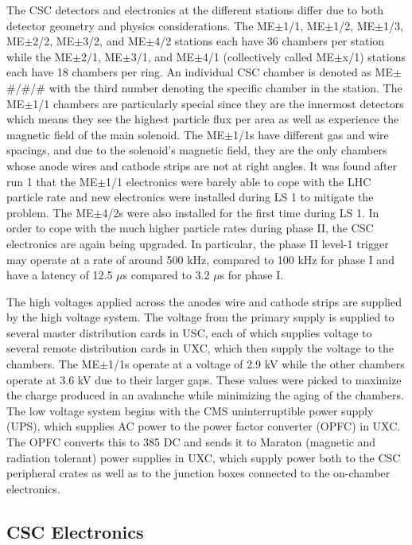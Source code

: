 \documentclass[10pt,a4paper]{article}
\begin{document}
The CSC detectors and electronics at the different stations differ due to both detector geometry and physics considerations. The ME$\pm$1/1, ME$\pm$1/2, ME$\pm$1/3, ME$\pm$2/2, ME$\pm$3/2, and ME$\pm$4/2 stations each have 36 chambers per station while the ME$\pm$2/1, ME$\pm$3/1, and ME$\pm$4/1 (collectively called ME$\pm$x/1) stations each have 18 chambers per ring. An individual CSC chamber is denoted as ME$\pm$\#/\#/\# with the third number denoting the specific chamber in the station. The ME$\pm$1/1 chambers are particularly special since they are the innermost detectors which means they see the highest particle flux per area as well as experience the magnetic field of the main solenoid. The ME$\pm$1/1s have different gas and wire spacings, and due to the solenoid's magnetic field, they are the only chambers whose anode wires and cathode strips are not at right angles. It was found after run 1 that the ME$\pm$1/1 electronics were barely able to cope with the LHC particle rate and new electronics were installed during LS 1 to mitigate the problem. The ME$\pm$4/2s were also installed for the first time during LS 1. In order to cope with the much higher particle rates during phase II, the CSC electronics are again being upgraded. In particular, the phase II level-1 trigger may operate at a rate of around 500 kHz, compared to 100 kHz for phase I and have a latency of 12.5 $\mu$s compared to 3.2 $\mu$s for phase I. 

The high voltages applied across the anodes wire and cathode strips are supplied by the high voltage system. The voltage from the primary supply is supplied to several master distribution cards in USC, each of which supplies voltage to several remote distribution cards in UXC, which then supply the voltage to the chambers. The ME$\pm$1/1s operate at a voltage of 2.9 kV while the other chambers operate at 3.6 kV due to their larger gaps. These values were picked to maximize the charge produced in an avalanche while minimizing the aging of the chambers. The low voltage system begins with the CMS uninterruptible power supply (UPS), which supplies AC power to the power factor converter (OPFC) in UXC. The OPFC converts this to 385 DC and sends it to Maraton (magnetic and radiation tolerant) power supplies in UXC, which supply power both to the CSC peripheral crates as well as to the junction boxes connected to the on-chamber electronics. 

\subsection{CSC Electronics}
\end{document}
